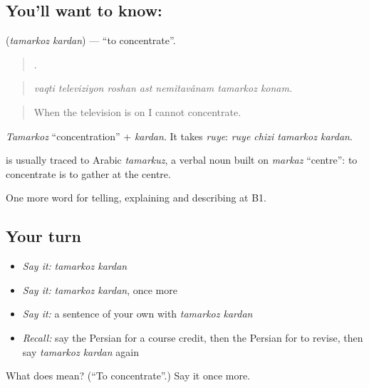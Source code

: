 \subsection*{You'll want to know:  }
\textbf{ } (\emph{tamarkoz kardan}) — \textquotedblleft{}to concentrate\textquotedblright{}.

\begin{quote}
      .
\end{quote}

\begin{quote}
\emph{vaqti televiziyon roshan ast nemitavânam tamarkoz konam.}
\end{quote}

\begin{quote}
When the television is on I cannot concentrate.
\end{quote}

\emph{Tamarkoz} \textquotedblleft{}concentration\textquotedblright{} + \emph{kardan}. It takes \emph{ruye}: \emph{ruye chizi tamarkoz kardan}.

\begin{cousinweb}
\textbf{} is usually traced to Arabic \emph{tamarkuz}, a verbal noun built on \emph{markaz} \textquotedblleft{}centre\textquotedblright{}: to concentrate is to gather at the centre.
\end{cousinweb}

\begin{grammarlens}[title={What you've built}]
One more word for telling, explaining and describing at B1.
\end{grammarlens}

\subsection*{Your turn}
\begin{itemize}
\raggedright
  \item \emph{Say it:} \emph{tamarkoz kardan}
  \item \emph{Say it:} \emph{tamarkoz kardan}, once more
  \item \emph{Say it:} a sentence of your own with \emph{tamarkoz kardan}
  \item \emph{Recall:} say the Persian for a course credit, then the Persian for to revise, then say \emph{tamarkoz kardan} again
\end{itemize}

\begin{tcolorbox}[breakable,colback=teal!4,colframe=teal!35!black,title={Before you move on}]
What does   mean? (\textquotedblleft{}To concentrate\textquotedblright{}.) Say it once more.
\end{tcolorbox}
